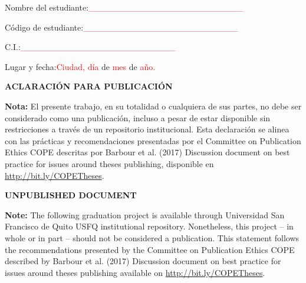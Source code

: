 \documentclass[journal]{IEEEtran}
\newenvironment{customfontsize}{
    \fontsize{12}{14}\selectfont
}{}
\begin{document}
\begin{customfontsize}
\vspace{30pt}

Nombre del estudiante:\hspace{4cm}\textcolor{red}  {\_\_\_\_\_\_\_\_\_\_\_\_\_\_\_\_\_\_\_\_\_\_\_\_\_}\\
\vspace{30pt}

Código de estudiante:\hspace{4.2cm}\textcolor{red}{\_\_\_\_\_\_\_\_\_\_\_\_\_\_\_\_\_\_\_\_\_\_\_\_\_}\\
\vspace{30pt}

C.I.:\hspace{7.3cm}\textcolor{red}{\_\_\_\_\_\_\_\_\_\_\_\_\_\_\_\_\_\_\_\_\_\_\_\_\_}\\
\vspace{30pt}

Lugar y fecha:\hspace{5.4cm}\textcolor{red}{Ciudad, día} de \textcolor{red}{mes} de \textcolor{red}{año.}

\end{customfontsize}


\newpage

\begin{center}
\textbf{\fontsize{14}{16}\selectfont ACLARACIÓN PARA PUBLICACIÓN}\\
\end{center}
\vspace{10pt}

\fontsize{12}{14}\selectfont \textbf{Nota:} El presente trabajo, en su totalidad o cualquiera de sus partes, no debe ser considerado como una publicación, incluso a pesar de estar disponible sin restricciones a través de un repositorio institucional. Esta declaración se alinea con las prácticas y recomendaciones presentadas por el Committee on Publication Ethics COPE descritas por Barbour et al. (2017) Discussion document on best practice for issues around theses publishing, disponible en \url{http://bit.ly/COPETheses}.
\vspace{10pt}
\begin{center}
\textbf{\fontsize{14}{16}\selectfont UNPUBLISHED DOCUMENT}\\
\end{center}
\vspace{10pt}
\fontsize{12}{14}\selectfont \textbf{Note:} The following graduation project is available through Universidad San Francisco de Quito USFQ institutional repository. Nonetheless, this project -- in whole or in part -- should not be considered a publication. This statement follows the recommendations presented by the Committee on Publication Ethics COPE described by Barbour et al. (2017) Discussion document on best practice for issues around theses publishing available on \url{http://bit.ly/COPETheses}.
\end{document}
